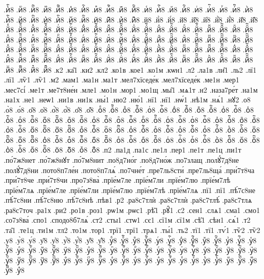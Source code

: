 {.иⷺ҇8
.иⷻ8
.иⷻ҇8
.иⷼ8
.иⷼ҇8
.иⷽ8
.иⷽ҇8
.иⷾ8
.иⷾ҇8
.иⷿ8
.иⷿ҇8
.иꙴ8
.иꙴ҇8
.иꙵ8
.иꙵ҇8
.иꙶ8
.иꙶ҇8
.иꙷ8
.иꙷ҇8
.иꙸ8
.иꙸ҇8
.иꙹ8
.иꙹ҇8
.иꙺ8
.иꙺ҇8
.иꙻ8
.иꙻ҇8
.и꙼8
.и꙼҇8
.и꙽8
.и꙽҇8
.й8
.й̀8
.й́8
.й̈8
.й̑8
.й҆8
.й҆̀8
.й҆́8
.й҆̈8
.й҆̑8
.йⷠ8
.йⷠ҇8
.йⷡ8
.йⷡ҇8
.йⷢ8
.йⷢ҇8
.йⷣ8
.йⷣ҇8
.йⷤ8
.йⷤ҇8
.йⷥ8
.йⷥ҇8
.йⷦ8
.йⷦ҇8
.йⷧ8
.йⷧ҇8
.йⷨ8
.йⷨ҇8
.йⷩ8
.йⷩ҇8
.йⷪ8
.йⷪ҇8
.йⷫ8
.йⷫ҇8
.йⷬ8
.йⷬ҇8
.йⷭ8
.йⷭ҇8
.йⷮ8
.йⷮ҇8
.йⷯ8
.йⷯ҇8
.йⷰ8
.йⷰ҇8
.йⷱ8
.йⷱ҇8
.йⷲ8
.йⷲ҇8
.йⷳ8
.йⷳ҇8
.йⷴ8
.йⷴ҇8
.йⷵ8
.йⷵ҇8
.йⷶ8
.йⷶ҇8
.йⷷ8
.йⷷ҇8
.йⷸ8
.йⷸ҇8
.йⷹ8
.йⷹ҇8
.йⷺ8
.йⷺ҇8
.йⷻ8
.йⷻ҇8
.йⷼ8
.йⷼ҇8
.йⷽ8
.йⷽ҇8
.йⷾ8
.йⷾ҇8
.йⷿ8
.йⷿ҇8
.йꙴ8
.йꙴ҇8
.йꙵ8
.йꙵ҇8
.йꙶ8
.йꙶ҇8
.йꙷ8
.йꙷ҇8
.йꙸ8
.йꙸ҇8
.йꙹ8
.йꙹ҇8
.йꙺ8
.йꙺ҇8
.йꙻ8
.йꙻ҇8
.й꙼8
.й꙼҇8
.й꙽8
.й꙽҇8
.к2
.ка̑1
.ки2
.кл2
.ко1в
.кое1
.ко1м
.кѡн1
.л2
.ла1в
.ли̑1
.ль2
.лї1
.лї1
.лѷ1
.лѷ1
.м2
.мам1
.ма1н
.ма1т
.мел7хїседе́к
.мел7хїседе́к
.ме1н
.мер1
.мес7сі́
.ме1т
.ме7т8не́н
.мле1
.мо1н
.мор1
.мо1щ
.мы̑1
.мѧ1т
.н2
.наза7ре́т
.на1м
.на1х
.не1
.неѡ1
.ни1в
.ни1к
.ны́1
.ню2
.ню́1
.нї1
.нї1
.нѡ́1
.нѣ1м
.нѧ́1
.нꙋ2
.о8
.о̀8
.о́8
.о̑8
.о҆8
.о҆̀8
.о҆́8
.о҆̈8
.о҆̑8
.оⷠ8
.оⷠ҇8
.оⷡ8
.оⷡ҇8
.оⷢ8
.оⷢ҇8
.оⷣ8
.оⷣ҇8
.оⷤ8
.оⷤ҇8
.оⷥ8
.оⷥ҇8
.оⷦ8
.оⷦ҇8
.оⷧ8
.оⷧ҇8
.оⷨ8
.оⷨ҇8
.оⷩ8
.оⷩ҇8
.оⷪ8
.оⷪ҇8
.оⷫ8
.оⷫ҇8
.оⷬ8
.оⷬ҇8
.оⷭ8
.оⷭ҇8
.оⷮ8
.оⷮ҇8
.оⷯ8
.оⷯ҇8
.оⷰ8
.оⷰ҇8
.оⷱ8
.оⷱ҇8
.оⷲ8
.оⷲ҇8
.оⷳ8
.оⷳ҇8
.оⷴ8
.оⷴ҇8
.оⷵ8
.оⷵ҇8
.оⷶ8
.оⷶ҇8
.оⷷ8
.оⷷ҇8
.оⷸ8
.оⷸ҇8
.оⷹ8
.оⷹ҇8
.оⷺ8
.оⷺ҇8
.оⷻ8
.оⷻ҇8
.оⷼ8
.оⷼ҇8
.оⷽ8
.оⷽ҇8
.оⷾ8
.оⷾ҇8
.оⷿ8
.оⷿ҇8
.оꙴ8
.оꙴ҇8
.оꙵ8
.оꙵ҇8
.оꙶ8
.оꙶ҇8
.оꙷ8
.оꙷ҇8
.оꙸ8
.оꙸ҇8
.оꙹ8
.оꙹ҇8
.оꙺ8
.оꙺ҇8
.оꙻ8
.оꙻ҇8
.о꙼8
.о꙼҇8
.о꙽8
.о꙽҇8
.п2
.па1д
.па1с
.пе1л
.пер1
.пе1т
.пе1ц
.пи1т
.по́7ж8нет
.по́7ж8нꙋт
.по́7м8нит
.по8д7но́г
.по8д7но́ж
.по7злащ
.полꙋ́7д8не
.полꙋ́7д8ни
.пото8п7ле́н
.пото8п7лѧ́
.по7чне́т
.пре7ль8сти́
.пре7ль8ща́
.при́7т8ча
.при́7т8че
.при́7т8чи
.про7з8ва̀
.прїе́м7ле
.прїе́м7ли
.прїе́м7лю
.прїе́м7лѣ
.прїе́м7лѧ
.прїе́м7ле
.прїе́м7ли
.прїе́м7лю
.прїе́м7лѣ
.прїе́м7лѧ
.пї1
.пї1
.пѣ́7с8не
.пѣ́7с8ни
.пѣ́7с8ню
.пѣ́7с8нѣ
.пѣв1
.р2
.ра8с7тлѝ
.ра8с7тлѝ
.ра8с7тлѣ́
.ра8с7тлѧ
.ра8с7точ
.ра1х
.ри2
.ро1в
.роз1
.рѡ1м
.рѡс1
.рѣ̑1
.рꙋ̑1
.с2
.сен1
.слѧ1
.сма1
.смо1
.со7з8ва́
.спо1
.сподо8б7лѧ́
.ст2
.сты1
.стѡ1
.сє1
.сї1м
.сї1м
.сѣ̑1
.сѣн1
.сѧ́1
.т2
.та̑1
.те1ц
.ти1м
.тл2
.то1м
.тор1
.трї1
.трї1
.трѧ1
.ты́1
.ть2
.тї1
.тї1
.тѵ́1
.тѷ2
.тѷ2
.у8
.у̀8
.у́8
.у̑8
.у҆8
.у҆̀8
.у҆́8
.у҆̈8
.у҆̑8
.уⷠ8
.уⷠ҇8
.уⷡ8
.уⷡ҇8
.уⷢ8
.уⷢ҇8
.уⷣ8
.уⷣ҇8
.уⷤ8
.уⷤ҇8
.уⷥ8
.уⷥ҇8
.уⷦ8
.уⷦ҇8
.уⷧ8
.уⷧ҇8
.уⷨ8
.уⷨ҇8
.уⷩ8
.уⷩ҇8
.уⷪ8
.уⷪ҇8
.уⷫ8
.уⷫ҇8
.уⷬ8
.уⷬ҇8
.уⷭ8
.уⷭ҇8
.уⷮ8
.уⷮ҇8
.уⷯ8
.уⷯ҇8
.уⷰ8
.уⷰ҇8
.уⷱ8
.уⷱ҇8
.уⷲ8
.уⷲ҇8
.уⷳ8
.уⷳ҇8
.уⷴ8
.уⷴ҇8
.уⷵ8
.уⷵ҇8
.уⷶ8
.уⷶ҇8
.уⷷ8
.уⷷ҇8
.уⷸ8
.уⷸ҇8
.уⷹ8
.уⷹ҇8
.уⷺ8
.уⷺ҇8
.уⷻ8
.уⷻ҇8
.уⷼ8
.уⷼ҇8
.уⷽ8
}
